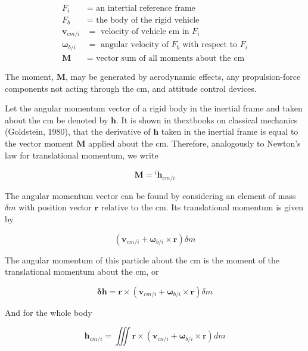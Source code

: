 \begin{align*}
    {F}_{i} &= \text{ an intertial reference frame} \\
    {F}_{b} &= \text{ the body of the rigid vehicle} \\
    \mathbf{v}_{cm/i} &= \text{ velocity of vehicle cm in }{F}_{i} \\
    \mathbf{\omega}_{b/i} &= \text{ angular velocity of }{F}_{b}\text{ with respect to }{F}_{i} \\
    \mathbf{M} &= \text{ vector sum of all moments about the cm}
\end{align*}

The moment, \(\mathbf{M}\), may be generated by aerodynamic effects, any propulsion-force components not acting through the cm, and attitude control devices.

Let the angular momentum vector of a rigid body in the inertial frame and taken about the cm be denoted by \(\mathbf{h}\). It is shown in thextbooks on classical mechanics (Goldstein, 1980), that the derivative of \(\mathbf{h}\) taken in the inertial frame is equal to the vector moment \(\mathbf{M}\) applied about the cm. Therefore, analogously to Newton's law for translational momentum, we write

\begin{equation}
    \mathbf{M}={^{i}\dot{\mathbf{h}}_{cm/i} \tag{1.7-1}}
\end{equation}

The angular momentum vector can be found by considering an element of mass \(\delta m\) with position vector \(\mathbf{r}\) relative to the cm. Its translational momentum is given by

\begin{equation*}
    \left( \mathbf{v}_{cm/i} + \mathbf{\omega}_{b/i} \times \mathbf{r} \right) \delta m
\end{equation*}

The angular momentum of this particle about the cm is the moment of the translational momentum about the cm, or

\begin{equation*}
    \mathbf{\delta h} = \mathbf{r} \times \left( \mathbf{v}_{cm/i} + \mathbf{\omega}_{b/i} \times \mathbf{r} \right) \delta m
\end{equation*}

And for the whole body

\begin{equation*}
    \mathbf{h}_{cm/i} = \iiint \mathbf{r} \times \left( \mathbf{v}_{cn/i} + \mathbf{\omega}_{b/i} \times \mathbf{r} \right) dm
    \end{equation*}

